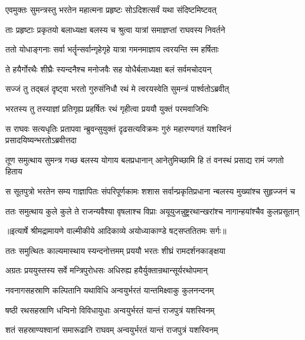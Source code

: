 \twolineshloka
{एवमुक्तः सुमन्त्रस्तु भरतेन महात्मना}
{प्रहृष्टः सोऽदिशत्सर्वं यथा संदिष्टमिष्टवत्} %

\twolineshloka
{ताः प्रहृष्टाः प्रकृतयो बलाध्यक्षा बलस्य च}
{श्रुत्वा यात्रां समाज्ञप्तां राघवस्य निवर्तने} %

\twolineshloka
{ततो योधाङ्गनाः सर्वा भर्तॄन्सर्वान्गृहेगृहे}
{यात्रा गमनमाज्ञाय त्वरयन्ति स्म हर्षिताः} %

\twolineshloka
{ते हयैर्गोरथैः शीघ्रैः स्यन्दनैश्च मनोजवैः}
{सह योधैर्बलाध्यक्षा बलं सर्वमचोदयन्} %

\twolineshloka
{सज्जं तु तद्बलं दृष्ट्वा भरतो गुरुसंनिधौ}
{रथं मे त्वरयस्वेति सुमन्त्रं पार्श्वतोऽब्रवीत्} %

\twolineshloka
{भरतस्य तु तस्याज्ञां प्रतिगृह्य प्रहर्षितः}
{रथं गृहीत्वा प्रययौ युक्तं परमवाजिभिः} %

\fourlineindentedshloka
{स राघवः सत्यधृतिः प्रतापवा}
{न्ब्रुवन्सुयुक्तं दृढसत्यविक्रमः}
{गुरुं महारण्यगतं यशस्विनं}
{ प्रसादयिष्यन्भरतोऽब्रवीत्तदा} %

\fourlineindentedshloka
{तूण समुत्थाय सुमन्त्र गच्छ}
{ बलस्य योगाय बलप्रधानान्}
{आनेतुमिच्छामि हि तं वनस्थं}
{ प्रसाद्य रामं जगतो हिताय} %

\fourlineindentedshloka
{स सूतपुत्रो भरतेन सम्य}
{गाज्ञापितः संपरिपूर्णकामः}
{शशास सर्वान्प्रकृतिप्रधाना}
{न्बलस्य मुख्यांश्च सुहृज्जनं च} %

\fourlineindentedshloka
{ततः समुत्थाय कुले कुले ते}
{ राजन्यवैश्या वृषलाश्च विप्राः}
{अयूयुजन्नुष्ट्ररथान्खरांश्च}
{ नागान्हयांश्चैव कुलप्रसूतान्} %


{॥इत्यार्षे श्रीमद्रामायणे वाल्मीकीये आदिकाव्ये अयोध्याकाण्डे षट्सप्ततितमः सर्गः॥}


\twolineshloka
{ततः समुत्थितः काल्यमास्थाय स्यन्दनोत्तमम्}
{प्रययौ भरतः शीघ्रं रामदर्शनकाङ्क्षया} %

\twolineshloka
{अग्रतः प्रययुस्तस्य सर्वे मन्त्रिपुरोधसः}
{अधिरुह्य हयैर्युक्तान्रथान्सूर्यरथोपमान्} %

\twolineshloka
{नवनागसहस्राणि कल्पितानि यथाविधि}
{अन्वयुर्भरतं यान्तमिक्ष्वाकु कुलनन्दनम्} %

\twolineshloka
{षष्ठी रथसहस्राणि धन्विनो विविधायुधाः}
{अन्वयुर्भरतं यान्तं राजपुत्रं यशस्विनम्} %

\twolineshloka
{शतं सहस्राण्यश्वानां समारूढानि राघवम्}
{अन्वयुर्भरतं यान्तं राजपुत्रं यशस्विनम्} %

